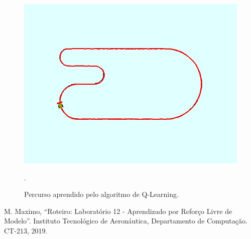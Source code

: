 \documentclass[conference]{IEEEtran}
\begin{document}
\begin{figure}[htbp]
\centering
\centerline{\includegraphics[scale=0.25]{imagens/q-learning/line_follower_solution.jpeg}}
\caption{Percurso aprendido pelo algoritmo de Q-Learning.}.
\label{q-learning/line_follower_solution}
\end{figure}

\begin{thebibliography}{00}
 M. Maximo, ``Roteiro: Laboratório 12 - Aprendizado por Reforço Livre de Modelo''. Instituto Tecnológico de Aeronáutica, Departamento de Computação. CT-213, 2019.
\end{thebibliography}
\end{document}
